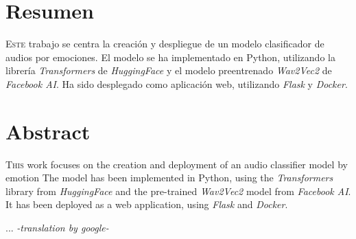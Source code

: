 \chapter*{Resumen}
\pagestyle{especial}
{}

\lettrine[lraise=-0.1, lines=2, loversize=0.2]{E}{ste} trabajo se centra la creación y despliegue de un modelo clasificador de audios por emociones.
El modelo se ha implementado en Python, utilizando la librería  \textit{Transformers} de \textit{HuggingFace} y el modelo preentrenado \textit{Wav2Vec2} de \textit{Facebook AI}.
Ha sido desplegado como aplicación web, utilizando \textit{Flask} y \textit{Docker}.



\chapter*{Abstract}
\pagestyle{especial}
{}

\lettrine[lraise=-0.1, lines=2, loversize=0.2]{T}{his} work focuses on the creation and deployment of an audio classifier model by emotion
The model has been implemented in Python, using the \textit{Transformers} library from \textit{HuggingFace} and the pre-trained \textit{Wav2Vec2} model from \textit{Facebook AI}.
It has been deployed as a web application, using \textit{Flask} and \textit{Docker}.

...
\emph{-translation by google-}


